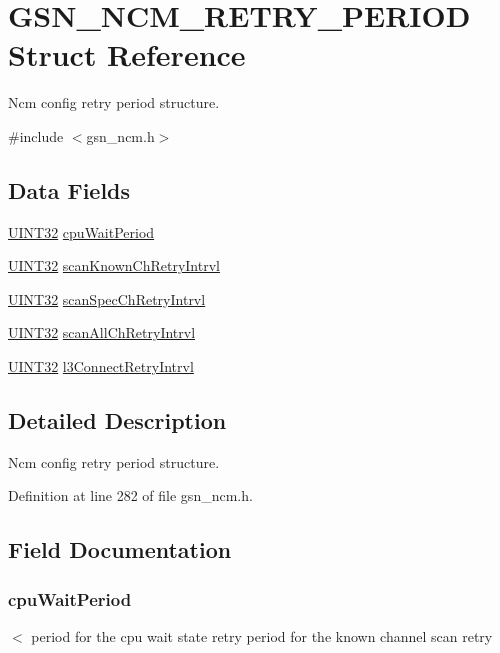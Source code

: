 \hypertarget{a00162}{
\section{GSN\_\-NCM\_\-RETRY\_\-PERIOD Struct Reference}
\label{a00162}
}


Ncm config retry period structure.  




{\ttfamily \#include $<$gsn\_\-ncm.h$>$}

\subsection*{Data Fields}
\begin{DoxyCompactItemize}
\item 
\hyperlink{a00660_gae1e6edbbc26d6fbc71a90190d0266018}{UINT32} \hyperlink{a00162_a1e5c348fe068d52b432c6b54bf62da0b}{cpuWaitPeriod}
\item 
\hyperlink{a00660_gae1e6edbbc26d6fbc71a90190d0266018}{UINT32} \hyperlink{a00162_ad1fac77c1f2a1c73296078ef959d5dfc}{scanKnownChRetryIntrvl}
\item 
\hyperlink{a00660_gae1e6edbbc26d6fbc71a90190d0266018}{UINT32} \hyperlink{a00162_ad9287c67ea0af98a129fb29730c68610}{scanSpecChRetryIntrvl}
\item 
\hyperlink{a00660_gae1e6edbbc26d6fbc71a90190d0266018}{UINT32} \hyperlink{a00162_a5ac879a69bca256a0e5546d077e44815}{scanAllChRetryIntrvl}
\item 
\hyperlink{a00660_gae1e6edbbc26d6fbc71a90190d0266018}{UINT32} \hyperlink{a00162_aa22a68fbe07fab38ee60393088fa8e51}{l3ConnectRetryIntrvl}
\end{DoxyCompactItemize}


\subsection{Detailed Description}
Ncm config retry period structure. 

Definition at line 282 of file gsn\_\-ncm.h.



\subsection{Field Documentation}
\hypertarget{a00162_a1e5c348fe068d52b432c6b54bf62da0b}{
\subsubsection[{cpuWaitPeriod}]{ {\bf cpuWaitPeriod}}}
\label{a00162_a1e5c348fe068d52b432c6b54bf62da0b}
$<$ period for the cpu wait state retry period for the known channel scan retry 

